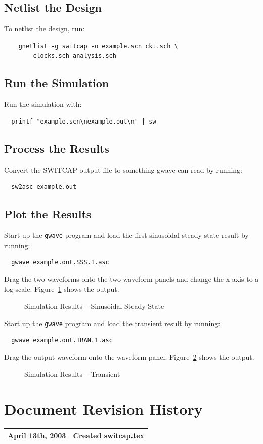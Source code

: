 \documentclass{article}
\begin{document}
\subsection{Netlist the Design}
To netlist the design, run:
\begin{verbatim}
    gnetlist -g switcap -o example.scn ckt.sch \ 
        clocks.sch analysis.sch
\end{verbatim}

\subsection{Run the Simulation}
Run the simulation with:
\begin{verbatim}
  printf "example.scn\nexample.out\n" | sw
\end{verbatim}

\subsection{Process the Results}
Convert the SWITCAP output file to something gwave can read by
running:
\begin{verbatim}
  sw2asc example.out
\end{verbatim}

\subsection{Plot the Results}
Start up the {\tt gwave} program and load the first sinusoidal steady
state result by running:
\begin{verbatim}
  gwave example.out.SSS.1.asc
\end{verbatim}
Drag the two waveforms onto the two waveform panels and change the
x-axis to a log scale.  Figure~\ref{fig:gwave_out_sss} shows the output.
\begin{figure}
\begin{center}
\end{center}
\caption{Simulation Results -- Sinusoidal Steady State}
\label{fig:gwave_out_sss}
\end{figure}
Start up the {\tt gwave} program and load the transient
result by running:
\begin{verbatim}
  gwave example.out.TRAN.1.asc
\end{verbatim}
Drag the output waveform onto the waveform panel.
Figure~\ref{fig:gwave_out_tran} shows the output.
\begin{figure}
\begin{center}
\end{center}
\caption{Simulation Results -- Transient}
\label{fig:gwave_out_tran}
\end{figure}

\newpage
\section{Document Revision History}

\begin{table}[h]
\begin{tabular}{|l|l|} \hline
April 13th, 2003 & Created switcap.tex \\ \hline
\end{tabular}
\end{table}
\end{document}
